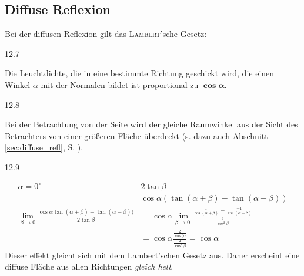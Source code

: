 \subsection{Diffuse Reflexion}
Bei der diffusen Reflexion gilt das \textsc{Lambert}'sche Gesetz:
\begin{center}
 12.7
\end{center}
Die Leuchtdichte, die in eine bestimmte Richtung geschickt wird, die einen Winkel $\alpha$ mit der Normalen bildet
ist proportional zu $\boldsymbol{\cos \alpha}$.
\begin{center}
 12.8
\end{center}
Bei der Betrachtung von der Seite wird der gleiche Raumwinkel aus der Sicht des Betrachters von einer größeren Fläche
überdeckt (s. dazu auch Abschnitt \ref{sec:diffuse_refl}, S. \pageref{lambert}).
\begin{center}
 12.9
\end{center}
\begin{align*}
 \alpha = 0^\circ \qquad & 2 \tan \beta\\
	& \cos \alpha (\tan (\alpha + \beta) - \tan(\alpha - \beta))\\
 \lim_{\beta \to 0} \frac{\cos \alpha \tan (\alpha + \beta) - \tan(\alpha - \beta))}{2 \tan \beta}
	&= \cos \alpha  \lim_{\beta \to 0} \frac{\frac{1}{\cos (\alpha + \beta)} - \frac{-1}{\cos (\alpha - \beta)}}
		{\frac{2}{\cos^2 \beta}}\\
	&= \cos \alpha \frac{\frac{2}{\cos (\alpha}}
		{\frac{2}{\cos^2 \beta}} = \cos \alpha	
\end{align*}
Dieser effekt gleicht sich mit dem Lambert'schen Gesetz aus. Daher erscheint eine diffuse Fläche aus allen Richtungen
\emph{gleich hell}.\\
